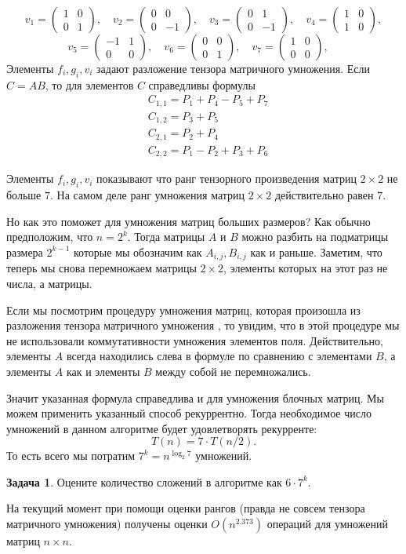 \documentclass[10pt,a4paper,oneside]{book}
\theoremstyle{definition}
\newtheorem{zad}{\color{violet!100!black}Задача}
\def\zd{\begin{zad}}
\def\ezd{\end{zad}}
\def\pmat{\begin{pmatrix}}
\def\epmat{\end{pmatrix}}
\begin{document}
$$
v_1= \pmat 1 & 0 \\ 0 & 1 \epmat,  \quad
v_2=\pmat 0& 0\\0 & -1\epmat,  \quad
v_3=\pmat 0 & 1 \\ 0 & -1 \epmat,  \quad
v_4=\pmat 1& 0\\1 & 0 \epmat,  
$$
$$
v_5=\pmat -1& 1\\ 0& 0\epmat,  \quad
v_6=\pmat 0&0 \\0 & 1\epmat,  \quad
v_7=\pmat 1& 0\\ 0& 0\epmat,  \quad
$$
Элементы $f_i,g_i,v_i$ задают разложение тензора матричного умножения. Если $C=AB$, то для элементов $C$ справедливы формулы
$$ 
\begin{aligned}
&C_{1,1}=P_1+P_4-P_5+P_7\\
&C_{1,2}=P_3+P_5\\
&C_{2,1}=P_2+P_4\\
&C_{2,2}=P_1-P_2+P_3+P_6
\end{aligned}
$$

Элементы $f_i,g_i,v_i$ показывают что ранг тензорного произведения матриц $2\times 2$ не больше $7$. На самом деле ранг умножения матриц $2\times 2$ действительно равен $7$.

Но как это поможет для умножения матриц больших размеров? Как обычно предположим, что $n=2^k$. Тогда матрицы $A$ и $B$ можно разбить на подматрицы размера $2^{k-1}$ которые мы обозначим как $A_{i,j}, B_{i,j}$ как и раньше. Заметим, что теперь мы снова перемножаем матрицы $2\times 2$, элементы которых на этот раз не числа, а матрицы. 

Если мы посмотрим процедуру умножения матриц, которая произошла из разложения тензора матричного умножения , то увидим, что в этой процедуре мы не использовали коммутативности умножения элементов поля. Действительно, элементы $A$ всегда находились слева в формуле по сравнению с элементами $B$, а элементы $A$ как и элементы $B$ между собой не перемножались.

Значит указанная формула справедлива и для умножения блочных матриц. Мы можем применить указанный способ рекуррентно. Тогда необходимое  число умножений в данном алгоритме будет удовлетворять рекурренте:
$$T(n)=7\cdot T(n/2).$$
То есть всего мы потратим $7^{k}=n^{\log_2 7}$ умножений.

\zd Оцените количество сложений в алгоритме как $6\cdot 7^k$.
\ezd

На текущий момент при помощи оценки рангов (правда не совсем тензора матричного умножения) получены оценки $O(n^{2.373})$ операций для умножений матриц $n\times n$.
\end{document}

